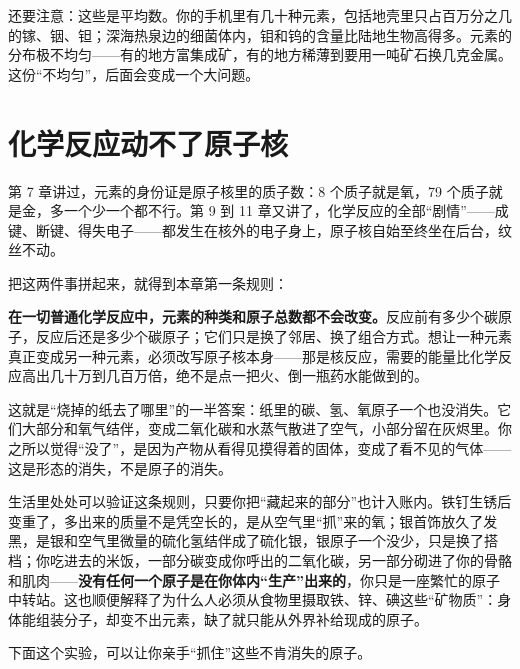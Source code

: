 还要注意：这些是平均数。你的手机里有几十种元素，包括地壳里只占百万分之几的镓、铟、钽；深海热泉边的细菌体内，钼和钨的含量比陆地生物高得多。元素的分布极不均匀——有的地方富集成矿，有的地方稀薄到要用一吨矿石换几克金属。这份“不均匀”，后面会变成一个大问题。

\section{化学反应动不了原子核}

第 7 章讲过，元素的身份证是原子核里的质子数：8 个质子就是氧，79 个质子就是金，多一个少一个都不行。第 9 到 11 章又讲了，化学反应的全部“剧情”——成键、断键、得失电子——都发生在核外的电子身上，原子核自始至终坐在后台，纹丝不动。

把这两件事拼起来，就得到本章第一条规则：

\begin{qiaoliang}
\textbf{在一切普通化学反应中，元素的种类和原子总数都不会改变。}反应前有多少个碳原子，反应后还是多少个碳原子；它们只是换了邻居、换了组合方式。想让一种元素真正变成另一种元素，必须改写原子核本身——那是核反应，需要的能量比化学反应高出几十万到几百万倍，绝不是点一把火、倒一瓶药水能做到的。
\end{qiaoliang}

这就是“烧掉的纸去了哪里”的一半答案：纸里的碳、氢、氧原子一个也没消失。它们大部分和氧气结伴，变成二氧化碳和水蒸气散进了空气，小部分留在灰烬里。你之所以觉得“没了”，是因为产物从看得见摸得着的固体，变成了看不见的气体——这是形态的消失，不是原子的消失。

生活里处处可以验证这条规则，只要你把“藏起来的部分”也计入账内。铁钉生锈后变重了，多出来的质量不是凭空长的，是从空气里“抓”来的氧；银首饰放久了发黑，是银和空气里微量的硫化氢结伴成了硫化银，银原子一个没少，只是换了搭档；你吃进去的米饭，一部分碳变成你呼出的二氧化碳，另一部分砌进了你的骨骼和肌肉——\textbf{没有任何一个原子是在你体内“生产”出来的}，你只是一座繁忙的原子中转站。这也顺便解释了为什么人必须从食物里摄取铁、锌、碘这些“矿物质”：身体能组装分子，却变不出元素，缺了就只能从外界补给现成的原子。

下面这个实验，可以让你亲手“抓住”这些不肯消失的原子。

